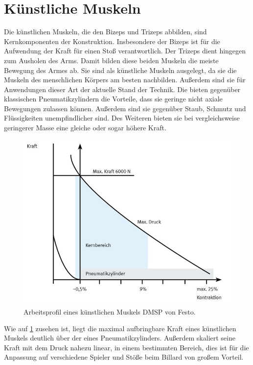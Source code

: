 	\section{Künstliche Muskeln}
		Die künstlichen Muskeln, die den Bizeps und Trizeps abbilden, sind Kernkomponenten der Konstruktion.
		Insbesondere der Bizeps ist für die Aufwendung der Kraft für einen Stoß verantwortlich.
		Der Trizeps dient hingegen zum Ausholen des Arms.
		Damit bilden diese beiden Muskeln die meiste Bewegung des Armes ab.
		Sie sind als künstliche Muskeln ausgelegt, da sie die Muskeln des menschlichen Körpers am besten nachbilden.
		Außerdem sind sie für Anwendungen dieser Art der aktuelle Stand der Technik.
		Die bieten gegenüber klassischen Pneumatikzylindern die Vorteile, dass sie geringe nicht axiale Bewegungen zulassen können.
		Außerdem sind sie gegenüber Staub, Schmutz und Flüssigkeiten unempfindlicher sind.
		Des Weiteren bieten sie bei vergleichsweise geringerer Masse eine gleiche oder sogar höhere Kraft.

		\begin{figure}[h]
			\centering
			\includegraphics[width=.75\textwidth]{Abb/ArbeitsprofilDMSP.jpg}
			\caption{Arbeitsprofil eines künstlichen Muskels DMSP von Festo.}
			\label{fig:ArbeitsprofilDMSP}
		\end{figure}

		Wie auf \cref{fig:ArbeitsprofilDMSP} zusehen ist, liegt die maximal aufbringbare Kraft eines künstlichen Muskels deutlich über der eines Pneumatikzylinders.
		Außerdem skaliert seine Kraft mit dem Druck nahezu linear, in einem bestimmten Bereich, dies ist für die Anpassung auf verschiedene Spieler und Stöße beim Billard von großem Vorteil.

